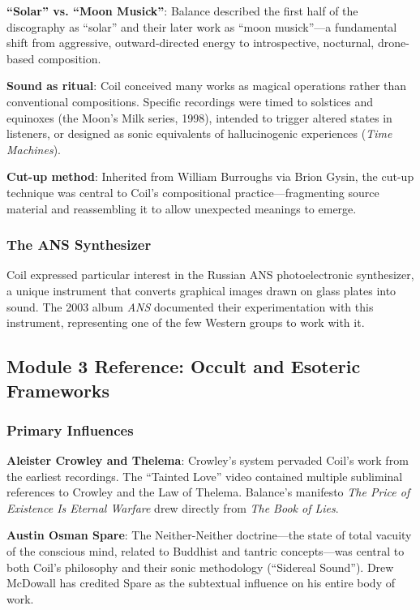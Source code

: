 \documentclass[11pt,letterpaper]{article}
\begin{document}
\textbf{``Solar'' vs. ``Moon Musick''}: Balance described the first half of the discography as ``solar'' and their later work as ``moon musick''---a fundamental shift from aggressive, outward-directed energy to introspective, nocturnal, drone-based composition.

\textbf{Sound as ritual}: Coil conceived many works as magical operations rather than conventional compositions. Specific recordings were timed to solstices and equinoxes (the Moon's Milk series, 1998), intended to trigger altered states in listeners, or designed as sonic equivalents of hallucinogenic experiences (\textit{Time Machines}).

\textbf{Cut-up method}: Inherited from William Burroughs via Brion Gysin, the cut-up technique was central to Coil's compositional practice---fragmenting source material and reassembling it to allow unexpected meanings to emerge.

\subsubsection{The ANS Synthesizer}

Coil expressed particular interest in the Russian ANS photoelectronic synthesizer, a unique instrument that converts graphical images drawn on glass plates into sound. The 2003 album \textit{ANS} documented their experimentation with this instrument, representing one of the few Western groups to work with it.

\subsection{Module 3 Reference: Occult and Esoteric Frameworks}

\subsubsection{Primary Influences}

\textbf{Aleister Crowley and Thelema}: Crowley's system pervaded Coil's work from the earliest recordings. The ``Tainted Love'' video contained multiple subliminal references to Crowley and the Law of Thelema. Balance's manifesto \textit{The Price of Existence Is Eternal Warfare} drew directly from \textit{The Book of Lies}.

\textbf{Austin Osman Spare}: The Neither-Neither doctrine---the state of total vacuity of the conscious mind, related to Buddhist and tantric concepts---was central to both Coil's philosophy and their sonic methodology (``Sidereal Sound''). Drew McDowall has credited Spare as the subtextual influence on his entire body of work.
\end{document}
